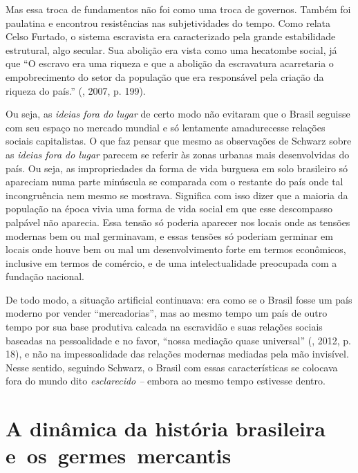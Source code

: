 Mas essa troca de fundamentos não foi como uma troca de governos. Também
foi paulatina e encontrou resistências nas subjetividades do tempo. Como
relata Celso Furtado, o sistema escravista era caracterizado pela grande
estabilidade estrutural, algo secular. Sua abolição era vista como uma
hecatombe social, já que ``O escravo era uma riqueza e que a abolição da
escravatura acarretaria o empobrecimento do setor da população que era
responsável pela criação da riqueza do país.'' (, 2007, p. 199).

Ou seja, as \emph{ideias fora do lugar} de certo modo não evitaram que o
Brasil seguisse com seu espaço no mercado mundial e só lentamente
amadurecesse relações sociais capitalistas. O que faz pensar que mesmo
as observações de Schwarz sobre as \emph{ideias fora do lugar} parecem
se referir às zonas urbanas mais desenvolvidas do país. Ou seja, as
impropriedades da forma de vida burguesa em solo brasileiro só apareciam
numa parte minúscula se comparada com o restante do país onde tal
incongruência nem mesmo se mostrava. Significa com isso dizer que a
maioria da população na época vivia uma forma de vida social em que esse
descompasso palpável não aparecia. Essa tensão só poderia aparecer nos locais
onde as tensões modernas bem ou mal germinavam, e essas tensões só
poderiam germinar em locais onde houve bem ou mal um desenvolvimento
forte em termos econômicos, inclusive em termos de comércio, e de uma
intelectualidade preocupada com a fundação nacional.

De todo modo, a situação artificial continuava: era como se o Brasil
fosse um país moderno por vender ``mercadorias'', mas ao mesmo tempo um
país de outro tempo por sua base produtiva calcada na escravidão e suas
relações sociais baseadas na pessoalidade e no favor, ``nossa mediação
quase universal'' (, 2012, p. 18), e não na impessoalidade das
relações modernas mediadas pela mão invisível. Nesse sentido,
seguindo Schwarz, o Brasil com essas características se colocava fora do
mundo dito \emph{esclarecido --} embora ao mesmo tempo estivesse dentro.

\section{A dinâmica da história brasileira e~os~germes~mercantis}

